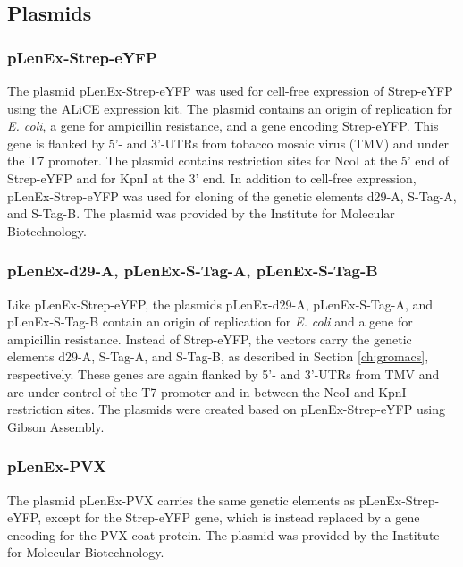 \FloatBarrier

\subsection{Plasmids}
\subsubsection{pLenEx-Strep-eYFP}
The plasmid pLenEx-Strep-eYFP was used for cell-free expression of Strep-eYFP using the ALiCE\textsuperscript{\textregistered} expression kit. The plasmid contains an origin of replication for \emph{E. coli}, a gene for ampicillin resistance, and a gene encoding Strep-eYFP. This gene is flanked by 5'- and 3'-UTRs from tobacco mosaic virus (TMV) and under the T7 promoter. The plasmid contains restriction sites for NcoI at the 5' end of Strep-eYFP and for KpnI at the 3' end. In addition to cell-free expression, pLenEx-Strep-eYFP was used for cloning of the genetic elements d29-A, S-Tag-A, and S-Tag-B. The plasmid was provided by the Institute for Molecular Biotechnology.

\subsubsection{pLenEx-d29-A, pLenEx-S-Tag-A, pLenEx-S-Tag-B}
Like pLenEx-Strep-eYFP, the plasmids pLenEx-d29-A, pLenEx-S-Tag-A, and pLenEx-S-Tag-B contain an origin of replication for \emph{E. coli} and a gene for ampicillin resistance. Instead of Strep-eYFP, the vectors carry the genetic elements d29-A, S-Tag-A, and S-Tag-B, as described in Section \ref{ch:gromacs}, respectively. These genes are again flanked by 5'- and 3'-UTRs from TMV and are under control of the T7 promoter and in-between the NcoI and KpnI restriction sites. The plasmids were created based on pLenEx-Strep-eYFP using Gibson Assembly.


\subsubsection{pLenEx-PVX}
The plasmid pLenEx-PVX carries the same genetic elements as pLenEx-Strep-eYFP, except for the Strep-eYFP gene, which is instead replaced by a gene encoding for the PVX coat protein. The plasmid was provided by the Institute for Molecular Biotechnology.
\FloatBarrier
